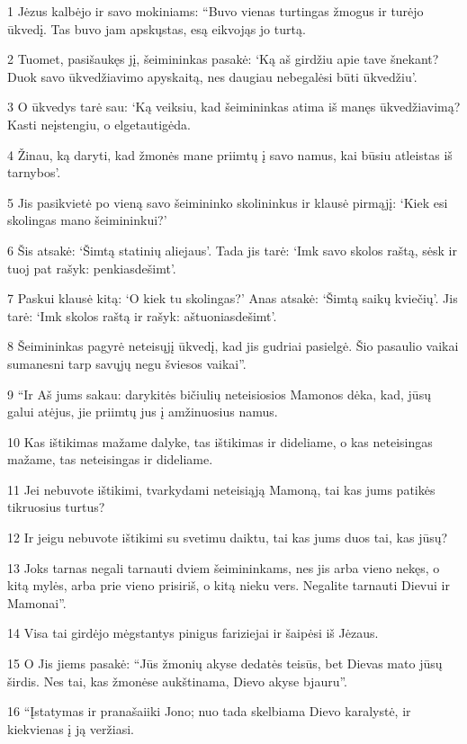 \par 1 Jėzus kalbėjo ir savo mokiniams: “Buvo vienas turtingas žmogus ir turėjo ūkvedį. Tas buvo jam apskųstas, esą eikvojąs jo turtą. 
\par 2 Tuomet, pasišaukęs jį, šeimininkas pasakė: ‘Ką aš girdžiu apie tave šnekant? Duok savo ūkvedžiavimo apyskaitą, nes daugiau nebegalėsi būti ūkvedžiu’. 
\par 3 O ūkvedys tarė sau: ‘Ką veiksiu, kad šeimininkas atima iš manęs ūkvedžiavimą? Kasti neįstengiu, o elgetauti­gėda. 
\par 4 Žinau, ką daryti, kad žmonės mane priimtų į savo namus, kai būsiu atleistas iš tarnybos’. 
\par 5 Jis pasikvietė po vieną savo šeimininko skolininkus ir klausė pirmąjį: ‘Kiek esi skolingas mano šeimininkui?’ 
\par 6 Šis atsakė: ‘Šimtą statinių aliejaus’. Tada jis tarė: ‘Imk savo skolos raštą, sėsk ir tuoj pat rašyk: penkiasdešimt’. 
\par 7 Paskui klausė kitą: ‘O kiek tu skolingas?’ Anas atsakė: ‘Šimtą saikų kviečių’. Jis tarė: ‘Imk skolos raštą ir rašyk: aštuoniasdešimt’. 
\par 8 Šeimininkas pagyrė neteisųjį ūkvedį, kad jis gudriai pasielgė. Šio pasaulio vaikai sumanesni tarp savųjų negu šviesos vaikai”. 
\par 9 “Ir Aš jums sakau: darykitės bičiulių neteisiosios Mamonos dėka, kad, jūsų galui atėjus, jie priimtų jus į amžinuosius namus. 
\par 10 Kas ištikimas mažame dalyke, tas ištikimas ir dideliame, o kas neteisingas mažame, tas neteisingas ir dideliame. 
\par 11 Jei nebuvote ištikimi, tvarkydami neteisiąją Mamoną, tai kas jums patikės tikruosius turtus? 
\par 12 Ir jeigu nebuvote ištikimi su svetimu daiktu, tai kas jums duos tai, kas jūsų? 
\par 13 Joks tarnas negali tarnauti dviem šeimininkams, nes jis arba vieno nekęs, o kitą mylės, arba prie vieno prisiriš, o kitą nieku vers. Negalite tarnauti Dievui ir Mamonai”. 
\par 14 Visa tai girdėjo mėgstantys pinigus fariziejai ir šaipėsi iš Jėzaus. 
\par 15 O Jis jiems pasakė: “Jūs žmonių akyse dedatės teisūs, bet Dievas mato jūsų širdis. Nes tai, kas žmonėse aukštinama, Dievo akyse bjauru”. 
\par 16 “Įstatymas ir pranašai­iki Jono; nuo tada skelbiama Dievo karalystė, ir kiekvienas į ją veržiasi. 
